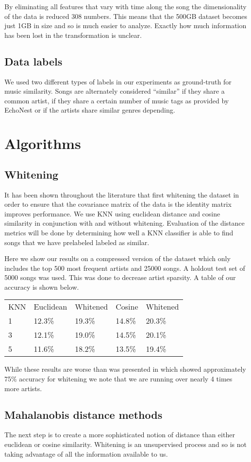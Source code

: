\documentclass[a4paper,10pt]{article}
\begin{document}
By eliminating all features that vary with time along the song the dimensionality of the data is reduced 308 numbers. This means that the 500GB dataset becomes just 1GB in size and so is much easier to analyze. Exactly how much information has been lost in the transformation is unclear. 
\subsection{Data labels}
We used two different types of labels in our experiments as ground-truth for music similarity. Songs are alternately considered ``similar'' if they share a common artist, if they share a certain number of music tags as provided by EchoNest or if the artists share similar genres depending.
\section{Algorithms}
\subsection{Whitening}
It has been shown throughout the literature that first whitening the dataset in order to ensure that the covariance matrix of the data is the identity matrix improves performance. We use KNN using euclidean distance and cosine similarity in conjunction with and without whitening. Evaluation of the distance metrics will be done by determining how well a KNN classifier is able to find songs that we have prelabeled labeled as similar.

Here we show our results on a compressed version of the dataset which only includes the top 500 most frequent artists and 25000 songs. A holdout test set of 5000 songs was used. This was done to decrease artist sparsity. A table of our accuracy is shown below.
\begin{center}
\begin{tabular}{lllll}
KNN & Euclidean & Whitened & Cosine & Whitened\\
1 & 12.3\% & 19.3\% & 14.8\% & 20.3\%\\
3 & 12.1\% & 19.0\% & 14.5\% & 20.1\% \\
5 & 11.6\% & 18.2\% & 13.5\% & 19.4\% 
\end{tabular}
\end{center}
While these results are worse than was presented in \cite{Slaney_learninga} which showed approximately 75\% accuracy for whitening we note that we are running over nearly 4 times more artists.
\subsection{Mahalanobis distance methods}
The next step is to create a more sophisticated notion of distance than either euclidean or cosine similarity. Whitening is an unsupervised process and so is not taking advantage of all the information available to us. 
\end{document}
